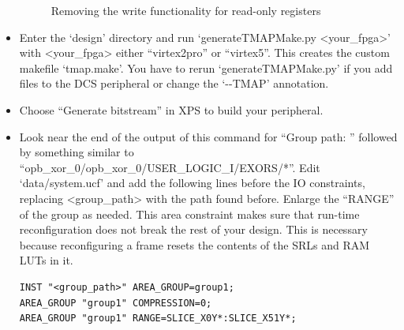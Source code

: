 \documentclass[a4paper,oneside]{memoir}
\begin{document}
\begin{itemize}
\begin{figure}[H]
\caption{Removing the write functionality for read-only registers\label{fig:design1}}
\end{figure}
\item Enter the `design' directory and run `generateTMAPMake.py <your\_fpga>' with <your\_fpga> either ``virtex2pro'' or ``virtex5''. This creates the custom makefile `tmap.make'. You have to rerun `generateTMAPMake.py' if you add files to the DCS peripheral or change the `-\--TMAP' annotation.
\item Choose ``Generate bitstream'' in XPS to build your peripheral.
\item Look near the end of the output of this command for ``Group path: '' followed by something similar to ``opb\_xor\_0/opb\_xor\_0/USER\_LOGIC\_I/EXORS/*''.
Edit `data/system.ucf' and add the following lines before the IO constraints, replacing <group\_path> with the path found before. Enlarge the ``RANGE'' of the group as needed. This area constraint makes sure that  run-time reconfiguration does not break the rest of your design. This is necessary because reconfiguring a frame resets the contents of the SRLs and RAM LUTs in it. 

\lstset{language=}
\begin{lstlisting}
INST "<group_path>" AREA_GROUP=group1;
AREA_GROUP "group1" COMPRESSION=0;
AREA_GROUP "group1" RANGE=SLICE_X0Y*:SLICE_X51Y*;
\end{lstlisting}


\end{itemize}
\end{document}
